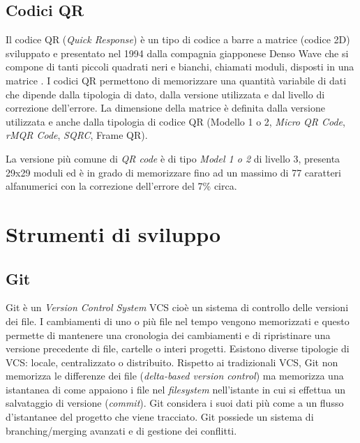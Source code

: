 \subsection{Codici QR}
Il codice QR (\textit{Quick Response}) è un tipo di codice a barre a matrice (codice 2D) sviluppato e presentato nel 1994 dalla compagnia giapponese Denso Wave che si compone di tanti piccoli quadrati neri e bianchi, chiamati moduli, disposti in una matrice \cite{qrCodeDensoWave}.
I codici QR permettono di memorizzare una quantità variabile di dati che dipende dalla tipologia di dato, dalla versione utilizzata e dal livello di correzione dell'errore. La dimensione della matrice è definita dalla versione utilizzata e anche dalla tipologia di codice QR (Modello 1 o 2, \textit{Micro QR Code}, \textit{rMQR Code}, \textit{SQRC}, Frame QR).

La versione più comune di \textit{QR code} è di tipo \textit{Model 1 o 2} di livello 3, presenta 29x29 moduli ed è in grado di memorizzare fino ad un massimo di 77 caratteri alfanumerici con la correzione dell'errore del 7\% circa.

\section{Strumenti di sviluppo}
\subsection{Git}
Git \cite{gitSite} è un \textit{Version Control System} VCS cioè un sistema di controllo delle versioni dei file. I cambiamenti di uno o più file nel tempo vengono memorizzati e questo permette di mantenere una cronologia dei cambiamenti e di ripristinare una versione precedente di file, cartelle o interi progetti. Esistono diverse tipologie di VCS: locale, centralizzato o distribuito.
Rispetto ai tradizionali VCS, Git non memorizza le differenze dei file (\textit{delta-based version control}) ma memorizza una istantanea di come appaiono i file nel \textit{filesystem} nell'istante in cui si effettua un salvataggio di versione (\textit{commit}). Git considera i suoi dati più come a un flusso d'istantanee del progetto che viene tracciato. Git possiede un sistema di branching/merging avanzati e di gestione dei conflitti.

